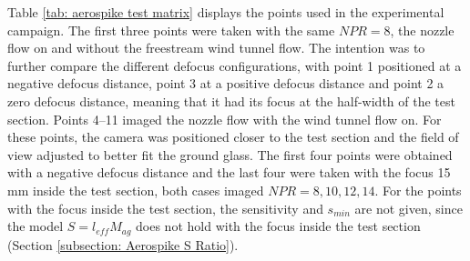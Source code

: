 Table \ref{tab: aerospike test matrix} displays the points used in the experimental campaign. The first three points were taken with the same $NPR = 8$, the nozzle flow on and without the freestream wind tunnel flow. The intention was to further compare the different defocus configurations, with point 1 positioned at a negative defocus distance, point 3 at a positive defocus distance and point 2 a zero defocus distance, meaning that it had its focus at the half-width of the test section. Points 4--11 imaged the nozzle flow with the wind tunnel flow on. For these points, the camera was positioned closer to the test section and the field of view adjusted to better fit the ground glass. The first four points were obtained with a negative defocus distance and the last four were taken with the focus 15 mm inside the test section, both cases imaged $NPR = 8,10,12,14$. For the points with the focus inside the test section, the sensitivity and $s_{min}$ are not given, since the model $S = l_{eff} M_{ag}$ does not hold with the focus inside the test section (Section \ref{subsection: Aerospike S Ratio}).

